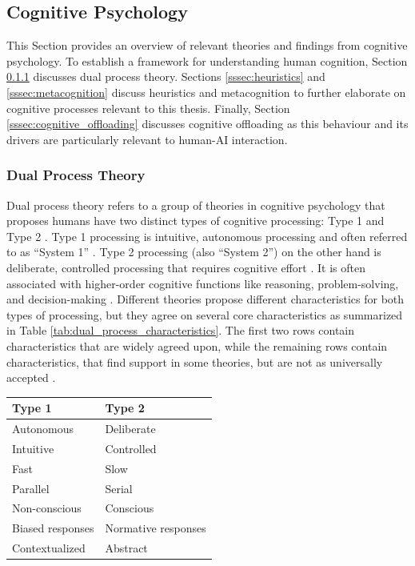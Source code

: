 \subsection{Cognitive Psychology} \label{ssec:cognitive_psychology}

This Section provides an overview of relevant theories and findings from cognitive psychology. To establish a framework for understanding human cognition, Section \ref{sssec:dual_process} discusses dual process theory. Sections \ref{sssec:heuristics} and \ref{sssec:metacognition} discuss heuristics and metacognition to further elaborate on cognitive processes relevant to this thesis. Finally, Section \ref{sssec:cognitive_offloading} discusses cognitive offloading as this behaviour and its drivers are particularly relevant to human-AI interaction.

\subsubsection{Dual Process Theory} \label{sssec:dual_process}

Dual process theory refers to a group of theories in cognitive psychology that proposes humans have two distinct types of cognitive processing: Type 1 and Type 2 \parencite{Evans2013}. Type 1 processing is intuitive, autonomous processing and often referred to as “System 1” \parencite{Kahneman2011}. Type 2 processing (also “System 2”) on the other hand is deliberate, controlled processing that requires cognitive effort \parencite{Evans2013}. It is often associated with higher-order cognitive functions like reasoning, problem-solving, and decision-making \parencite{Kahneman2011}. Different theories propose different characteristics for both types of processing, but they agree on several core characteristics as summarized in Table \ref{tab:dual_process_characteristics}. The first two rows contain characteristics that are widely agreed upon, while the remaining rows contain characteristics, that find support in some theories, but are not as universally accepted \parencite{Evans2013}.

\begin{ctable}
    \begin{tabular}{l|l}
        \textbf{Type 1} & \textbf{Type 2} \\
        \hline
        Autonomous & Deliberate \\
        Intuitive & Controlled \\
        \hline
        Fast & Slow \\
        Parallel & Serial \\
        Non-conscious & Conscious \\
        Biased responses & Normative responses \\
        Contextualized & Abstract \\
    \end{tabular}
    \caption[Type 1 and Type 2 Characteristics]{Common characteristics of Type 1 and Type 2 processing in dual process theories \parencite{Evans2013}}
    \label{tab:dual_process_characteristics}
\end{ctable}

